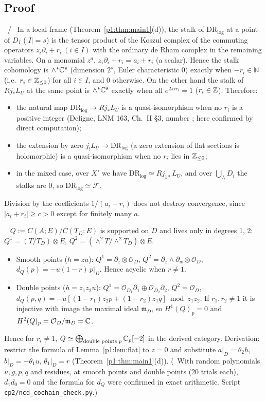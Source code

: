 \subsection{Proof}
\begin{lem}\tP\ /\ \tC\label{p1:lem:stalk}
In a local frame (Theorem~\ref{p1:thm:main1}(d)), the stalk of $\mathrm{DR}_{\log}$ at a point of $D_I$ ($|I|=s$) is the tensor product of the Koszul complex of the commuting operators $z_i\partial_i+r_i\ (i\in I)$ with the ordinary de Rham complex in the remaining variables. On a monomial $z^a$, $z_i\partial_i+r_i=a_i+r_i$ (a scalar). Hence the stalk cohomology is $\wedge^*\mathbb C^s$ (dimension $2^s$, Euler characteristic 0) exactly when $-r_i\in\mathbb N$ (i.e.\ $r_i\in\mathbb Z_{\le0}$) for all $i\in I$, and $0$ otherwise. On the other hand the stalk of $Rj_*L_U$ at the same point is $\wedge^*\mathbb C^s$ exactly when all $e^{2\pi ir_i}=1$ ($r_i\in\mathbb Z$). Therefore:
\begin{itemize}
\item the natural map $\mathrm{DR}_{\log}\to Rj_*L_U$ is a quasi-isomorphism when no $r_i$ is a positive integer (Deligne, LNM 163, Ch.~II \S3, number \tQ; here confirmed by direct computation);
\item the extension by zero $j_!L_U\to\mathrm{DR}_{\log}$ (a zero extension of flat sections is holomorphic) is a quasi-isomorphism when no $r_i$ lies in $\mathbb Z_{\le0}$;
\item in the mixed case, over $X'$ we have $\mathrm{DR}_{\log}\simeq Rj_{1*}L_U$, and over $\bigcup_{I_!}D_i$ the stalks are $0$, so $\mathrm{DR}_{\log}\simeq\mathcal F$.
\end{itemize}
Division by the coefficients $1/(a_i+r_i)$ does not destroy convergence, since $|a_i+r_i|\ge c>0$ except for finitely many $a$.
\end{lem}
\begin{lem}\tP\ \tV\label{p1:lem:Q}
$Q:=C(A;E)/C(T_D;E)$ is supported on $D$ and lives only in degrees 1, 2: $Q^1=(T/T_D)\otimes E$, $Q^2=(\wedge^2T/\wedge^2T_D)\otimes E$.
\begin{itemize}
\item Smooth points ($h=zu$): $Q^1=\partial_z\otimes\mathcal O_D$, $Q^2=\partial_z\wedge\partial_w\otimes\mathcal O_D$, $d_Q(p)=-u(1-r)\,p|_D$. Hence acyclic when $r\ne1$.
\item Double points ($h=z_1z_2u$): $Q^1=\mathcal O_{D_1}\partial_1\oplus\mathcal O_{D_2}\partial_2$, $Q^2=\mathcal O_D$, $d_Q(p,q)=-u[(1-r_1)z_2p+(1-r_2)z_1q]\bmod z_1z_2$. If $r_1,r_2\ne1$ it is injective with image the maximal ideal $\mathfrak m_D$, so $H^1(Q)_p=0$ and $H^2(Q)_p=\mathcal O_D/\mathfrak m_D=\mathbb C$.
\end{itemize}
Hence for $r_i\ne1$, $Q\simeq\bigoplus_{\text{double points }p}\mathbb C_p[-2]$ in the derived category.
Derivation: restrict the formula of Lemma~\ref{p1:lem:flat} to $z=0$ and substitute $a|_D=\theta_2h$, $b|_D=-\theta_1u$, $\theta_1|_D=r$ (Theorem~\ref{p1:thm:main1}(d)). (\tV\ With random polynomials $u,g,p,q$ and residues, at smooth points and double points (20 trials each), $d_1d_0=0$ and the formula for $d_Q$ were confirmed in exact arithmetic. Script \texttt{cp2/ncd\_cochain\_check.py}.)
\end{lem}
